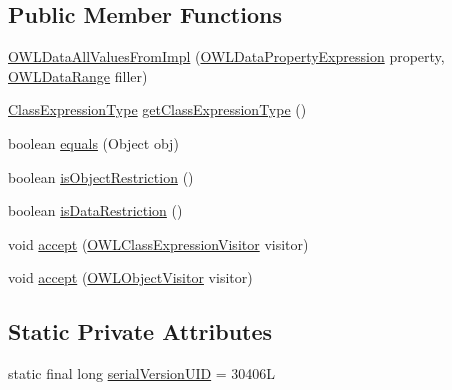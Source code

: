 \subsection*{Public Member Functions}
\begin{DoxyCompactItemize}
\item 
\hyperlink{classuk_1_1ac_1_1manchester_1_1cs_1_1owl_1_1owlapi_1_1_o_w_l_data_all_values_from_impl_a1a70ab0c630d812afce5b8ed68d372e8}{O\-W\-L\-Data\-All\-Values\-From\-Impl} (\hyperlink{interfaceorg_1_1semanticweb_1_1owlapi_1_1model_1_1_o_w_l_data_property_expression}{O\-W\-L\-Data\-Property\-Expression} property, \hyperlink{interfaceorg_1_1semanticweb_1_1owlapi_1_1model_1_1_o_w_l_data_range}{O\-W\-L\-Data\-Range} filler)
\item 
\hyperlink{enumorg_1_1semanticweb_1_1owlapi_1_1model_1_1_class_expression_type}{Class\-Expression\-Type} \hyperlink{classuk_1_1ac_1_1manchester_1_1cs_1_1owl_1_1owlapi_1_1_o_w_l_data_all_values_from_impl_a3a3fa446ad38e1130461dea778ccb117}{get\-Class\-Expression\-Type} ()
\item 
boolean \hyperlink{classuk_1_1ac_1_1manchester_1_1cs_1_1owl_1_1owlapi_1_1_o_w_l_data_all_values_from_impl_a86e91ab6c28cb52f318d075fb4f2b606}{equals} (Object obj)
\item 
boolean \hyperlink{classuk_1_1ac_1_1manchester_1_1cs_1_1owl_1_1owlapi_1_1_o_w_l_data_all_values_from_impl_a0b5d6231dfe029aa8327cabb31bb953d}{is\-Object\-Restriction} ()
\item 
boolean \hyperlink{classuk_1_1ac_1_1manchester_1_1cs_1_1owl_1_1owlapi_1_1_o_w_l_data_all_values_from_impl_a01f9e11e335a031cc48a4beb643e5501}{is\-Data\-Restriction} ()
\item 
void \hyperlink{classuk_1_1ac_1_1manchester_1_1cs_1_1owl_1_1owlapi_1_1_o_w_l_data_all_values_from_impl_a66cba98edd99c03bbf9ca9dc1c4137a8}{accept} (\hyperlink{interfaceorg_1_1semanticweb_1_1owlapi_1_1model_1_1_o_w_l_class_expression_visitor}{O\-W\-L\-Class\-Expression\-Visitor} visitor)
\item 
void \hyperlink{classuk_1_1ac_1_1manchester_1_1cs_1_1owl_1_1owlapi_1_1_o_w_l_data_all_values_from_impl_ac4dcdf17a9544ff0ba08b59abe7f3a17}{accept} (\hyperlink{interfaceorg_1_1semanticweb_1_1owlapi_1_1model_1_1_o_w_l_object_visitor}{O\-W\-L\-Object\-Visitor} visitor)
\end{DoxyCompactItemize}
\subsection*{Static Private Attributes}
\begin{DoxyCompactItemize}
\item 
static final long \hyperlink{classuk_1_1ac_1_1manchester_1_1cs_1_1owl_1_1owlapi_1_1_o_w_l_data_all_values_from_impl_a6461cd432e17600fad50b30aa4da5dd2}{serial\-Version\-U\-I\-D} = 30406\-L
\end{DoxyCompactItemize}
